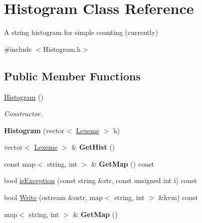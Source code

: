 \hypertarget{classHistogram}{}\section{Histogram Class Reference}
\label{classHistogram}


A string histogram for simple counting (currently)  




{\ttfamily \#include $<$Histogram.\+h$>$}

\subsection*{Public Member Functions}
\begin{DoxyCompactItemize}
\item 
\mbox{\label{classHistogram_af681f293852ac145f867ecfcce3062a5}} 
\hyperlink{classHistogram_af681f293852ac145f867ecfcce3062a5}{Histogram} ()
\begin{DoxyCompactList}\small\item\em Constructor. \end{DoxyCompactList}\item 
\mbox{\label{classHistogram_a5e56d61b85862889a024c1a682981964}} 
{\bfseries Histogram} (vector$<$ \hyperlink{classLexeme}{Lexeme} $>$ h)
\item 
\mbox{\label{classHistogram_afe807b7c5109c6a9781216961f2a9e90}} 
vector$<$ \hyperlink{classLexeme}{Lexeme} $>$ \& {\bfseries Get\+Hist} ()
\item 
\mbox{\label{classHistogram_a605a2f87dcbe0c52e956ed6e559daf81}} 
const map$<$ string, int $>$ \& {\bfseries Get\+Map} () const
\item 
bool \hyperlink{classHistogram_aff24f16064c037ca8929c4f9751aedbf}{is\+Exception} (const string \&str, const unsigned int i) const
\item 
bool \hyperlink{classHistogram_af8b644d9dcb8dd86fb3420640de72ab2}{Write} (ostream \&ostr, map$<$ string, int $>$ \&kvm) const
\item 
\mbox{\label{classHistogram_a7a4b270eb5d88df6466cef9433a95d39}} 
map$<$ string, int $>$ \& {\bfseries Get\+Map} ()
\item 
\mbox{\label{classHistogram_a3b48f22da2e0c9f1d12ecd7a83f0dcf6}} 

\end{DoxyCompactItemize}
